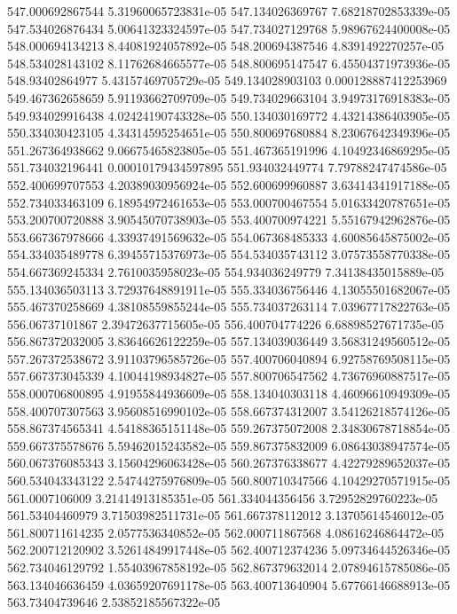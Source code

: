 {547.000692867544 5.31960065723831e-05
547.134026369767 7.68218702853339e-05
547.534026876434 5.00641323324597e-05
547.734027129768 5.98967624400008e-05
548.000694134213 8.44081924057892e-05
548.200694387546 4.8391492270257e-05
548.534028143102 8.11762684665577e-05
548.800695147547 6.45504371973936e-05
548.93402864977 5.43157469705729e-05
549.134028903103 0.000128887412253969
549.467362658659 5.91193662709709e-05
549.734029663104 3.94973176918383e-05
549.934029916438 4.02424190743328e-05
550.134030169772 4.43214386403905e-05
550.334030423105 4.34314595254651e-05
550.800697680884 8.23067642349396e-05
551.267364938662 9.06675465823805e-05
551.467365191996 4.10492346869295e-05
551.734032196441 0.00010179434597895
551.934032449774 7.79788247474586e-05
552.400699707553 4.20389030956924e-05
552.600699960887 3.63414341917188e-05
552.734033463109 6.18954972461653e-05
553.000700467554 5.01633420787651e-05
553.200700720888 3.90545070738903e-05
553.400700974221 5.55167942962876e-05
553.667367978666 4.33937491569632e-05
554.067368485333 4.60085645875002e-05
554.334035489778 6.39455715376973e-05
554.534035743112 3.07573558770338e-05
554.667369245334 2.7610035958023e-05
554.934036249779 7.34138435015889e-05
555.134036503113 3.72937648891911e-05
555.334036756446 4.13055501682067e-05
555.467370258669 4.38108559855244e-05
555.734037263114 7.03967717822763e-05
556.06737101867 2.39472637715605e-05
556.400704774226 6.68898527671735e-05
556.867372032005 3.83646626122259e-05
557.134039036449 3.56831249560512e-05
557.267372538672 3.91103796585726e-05
557.400706040894 6.92758769508115e-05
557.667373045339 4.10044198934827e-05
557.800706547562 4.73676960887517e-05
558.000706800895 4.91955844936609e-05
558.134040303118 4.46096610949309e-05
558.400707307563 3.95608516990102e-05
558.667374312007 3.54126218574126e-05
558.867374565341 4.54188365151148e-05
559.267375072008 2.34830678718854e-05
559.667375578676 5.59462015243582e-05
559.867375832009 6.08643038947574e-05
560.067376085343 3.15604296063428e-05
560.267376338677 4.42279289652037e-05
560.534043343122 2.54744275976809e-05
560.800710347566 4.10429270571915e-05
561.0007106009 3.21414913185351e-05
561.334044356456 3.72952829760223e-05
561.53404460979 3.71503982511731e-05
561.667378112012 3.13705614546012e-05
561.800711614235 2.0577536340852e-05
562.000711867568 4.08616246864472e-05
562.200712120902 3.52614849917448e-05
562.400712374236 5.09734644526346e-05
562.734046129792 1.55403967858192e-05
562.867379632014 2.07894615785086e-05
563.134046636459 4.03659207691178e-05
563.400713640904 5.67766146688913e-05
563.73404739646 2.53852185567322e-05
}
